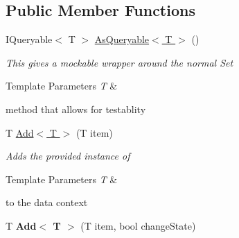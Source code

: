 \subsection*{Public Member Functions}
\begin{DoxyCompactItemize}
\item 
I\-Queryable$<$ T $>$ \hyperlink{class_framework_extension_1_1_entity_framework_1_1_tests_1_1_unit_tests_1_1_e_f_failure_context_a6991c5a792c54f0a1a695907e52ba685}{As\-Queryable$<$ T $>$} ()
\begin{DoxyCompactList}\small\item\em This gives a mockable wrapper around the normal Set
\begin{DoxyTemplParams}{Template Parameters}
{\em T} & \\
\hline
\end{DoxyTemplParams}
method that allows for testablity \end{DoxyCompactList}\item 
T \hyperlink{class_framework_extension_1_1_entity_framework_1_1_tests_1_1_unit_tests_1_1_e_f_failure_context_a8e82869480647106cd2369cbbbe9ca49}{Add$<$ T $>$} (T item)
\begin{DoxyCompactList}\small\item\em Adds the provided instance of 
\begin{DoxyTemplParams}{Template Parameters}
{\em T} & \\
\hline
\end{DoxyTemplParams}
to the data context \end{DoxyCompactList}\item 
\hypertarget{class_framework_extension_1_1_entity_framework_1_1_tests_1_1_unit_tests_1_1_e_f_failure_context_a989a7cf4b7800016d3e9413ad5cd788a}{T {\bfseries Add$<$ T $>$} (T item, bool change\-State)}\label{class_framework_extension_1_1_entity_framework_1_1_tests_1_1_unit_tests_1_1_e_f_failure_context_a989a7cf4b7800016d3e9413ad5cd788a}


\end{DoxyCompactItemize}
